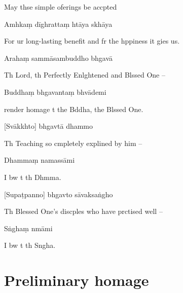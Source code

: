 \begin{english}
May thse simple oferings be accpted
\end{english}

Amhkaṃ dīghrattaṃ htāya skhāya

\begin{english}
For ur long-lasting benefit and fr the hppiness it gies us.
\end{english}

Arahaṃ sammāsambuddho bhgavā

\begin{english}
Th Lord, th Perfectly Enlghtened and Blssed One --
\end{english}

Buddhaṃ bhgavantaṃ bhvādemi

\begin{english}
   render homage t the Bddha, the Blssed One.
\end{english}

[Svākkhto] bhgavtā dhammo

\begin{english}
  Th Teaching so cmpletely explined by him --
\end{english}

Dhammaṃ namassāmi

\begin{english}
  I bw t th Dhmma.
\end{english}

[Supaṭpanno] bhgavto sāvaksaṅgho

\begin{english}
Th Blessed One's discples who have prctised well --
\end{english}

Sṅghaṃ nmāmi

\begin{english}
  I bw t th Sngha.
\end{english}

\chapter[Namo Tassa]{Preliminary homage}

\begin{leader}
\end{leader}

